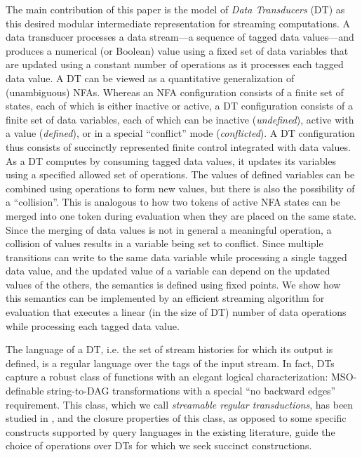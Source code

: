The main contribution of this paper is the model of \emph{Data Transducers} (DT) as this desired
modular intermediate representation for streaming computations.
A data transducer processes a data stream---a sequence of tagged data values---and produces
a numerical (or Boolean) value using a fixed set of data variables that are updated
using a constant number of operations as it processes each tagged data value.
A DT can be viewed as a quantitative generalization of (unambiguous) NFAs.
Whereas an NFA configuration consists of a finite set of states, each of which is either inactive or active, %
a DT configuration consists of a finite set of data variables, each of which can be inactive (\emph{undefined}), active
with a value (\emph{defined}), or in a special ``conflict'' mode (\emph{conflicted}).
A DT configuration thus consists of succinctly represented finite control integrated with data values.
As a DT computes by consuming tagged data values, it updates its variables using a specified allowed
set of operations. The values of defined variables can be combined using operations to form new values,
but there is also the possibility of a ``collision''.
This is analogous to how two tokens of active NFA states can be merged into one token
during evaluation when they are placed on the same state. Since the merging of data values
is not in general a meaningful operation, a collision of values results in a variable being set
to conflict.
Since multiple transitions can write to the same data variable while processing a single tagged data value,
and the updated value of a variable can depend on the updated values of the others,
the semantics is defined using fixed points.
We show how this semantics can be implemented
by an efficient streaming algorithm for evaluation that executes a linear (in the size of DT) number
of data operations while processing each tagged data value.

The language of a DT, i.e. the set of stream histories for which its output is defined,
is a regular language over the tags of the input stream.
In fact, DTs capture a robust class of functions with an elegant logical
characterization: MSO-definable string-to-DAG %
transformations with a special ``no backward edges'' requirement. %
This class, which we call \emph{streamable regular transductions}, has been studied in
\cite{EM1999MTT,C1994MSOGT} , and the closure properties of this class, as opposed to some specific constructs supported by
query languages in the existing literature, guide the choice of operations over
DTs for which we seek succinct constructions. %

